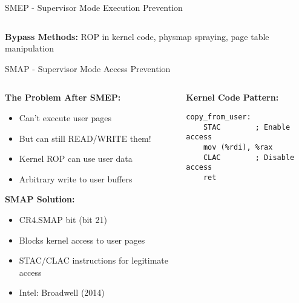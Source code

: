 \documentclass[aspectratio=169,12pt]{beamer}
\begin{document}
\begin{frame}{SMEP - Supervisor Mode Execution Prevention}
\begin{columns}
\begin{column}{0.5\textwidth}
        \end{column}
    \end{columns}
    
    \vspace{0.3cm}
    \begin{tcolorbox}[colback=yellow!20]
        \textbf{Bypass Methods:} ROP in kernel code, physmap spraying, page table manipulation
    \end{tcolorbox}
\end{frame}

\begin{frame}[fragile]{SMAP - Supervisor Mode Access Prevention}
    \begin{columns}
        \begin{column}{0.5\textwidth}
            \textbf{The Problem After SMEP:}
            \begin{itemize}
                \item Can't execute user pages
                \item But can still READ/WRITE them!
                \item Kernel ROP can use user data
                \item Arbitrary write to user buffers
            \end{itemize}
            
            \vspace{0.3cm}
            \textbf{SMAP Solution:}
            \begin{itemize}
                \item CR4.SMAP bit (bit 21)
                \item Blocks kernel access to user pages
                \item STAC/CLAC instructions for legitimate access
                \item Intel: Broadwell (2014)
            \end{itemize}
        \end{column}
        \begin{column}{0.5\textwidth}
            \begin{tcolorbox}[colback=gray!10]
                \small
                \textbf{Kernel Code Pattern:}
                \begin{verbatim}
copy_from_user:
    STAC        ; Enable access
    mov (%rdi), %rax
    CLAC        ; Disable access
    ret
    

\end{verbatim}
\end{tcolorbox}
\end{column}
\end{columns}
\end{frame}
\end{document}
